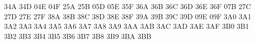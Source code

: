 { \mtsyadef@\blacktriangleleft34A
 \mtsyadef@\vartriangle34D
 \mtsyadef@\blacktriangle04E
 \mtsyadef@\triangledown04F
 \mtsyadef@{}
 \mtsyadef@{}
 \mtsyadef@{}
 \mtsyadef@{}
 \mtsyadef@{}
 \mtsyadef@{}
 \mtsyadef@{}
 \mtsyadef@{}
 \mtsyadef@\barwedge25A
 \mtsyadef@\doublebarwedge25B
 \mtsyadef@\measuredangle05D
 \mtsyadef@\sphericalangle05E
 \mtsyadef@\varpropto35F
 \mtsyadef@{}
 \mtsyadef@{}
 \mtsyadef@{}
 \mtsyadef@{}
 \mtsyadef@{}
 \let\doublecup\Cup
 \mtsyadef@{}
 \let\doublecap\Cap
 \mtsyadef@{}
 \mtsyadef@{}
 \mtsyadef@{}
 \mtsyadef@{}
 \mtsyadef@\subseteqq36A
 \mtsyadef@\supseteqq36B
 \mtsyadef@\bumpeq36C
 \mtsyadef@\Bumpeq36D
 \mtsyadef@\lll36E
 \let\llless\lll
 \mtsyadef@\ggg36F
 \let\gggtr\ggg
 \mtsyadef@{}
 \mtsyadef@{}
 \mtsyadef@{}
 \mtsyadef@{}
 \mtsyadef@{}
 \mtsyadef@\complement07B
 \mtsyadef@\intercal27C
 \mtsyadef@\circledcirc27D
 \mtsyadef@\circledast27E
 \mtsyadef@\circleddash27F
 \mtsyadef@{}
 \mtsyadef@{}
 \mtsyadef@{}
 \mtsyadef@{}
 \mtsyadef@{}
 \mtsyadef@{}
 \mtsyadef@{}
 \mtsyadef@{}
 \mtsyadef@{}
 \mtsyadef@{}
 \mtsyadef@\nleqslant38A
 \mtsyadef@\ngeqslant38B
 \mtsyadef@\lneq38C
 \mtsyadef@\gneq38D
 \mtsyadef@\npreceq38E
 \mtsyadef@\nsucceq38F
 \mtsyadef@{}
 \mtsyadef@{}
 \mtsyadef@{}
 \mtsyadef@{}
 \mtsyadef@{}
 \mtsyadef@{}
 \mtsyadef@{}
 \mtsyadef@{}
 \mtsyadef@{}
 \mtsyadef@{}
 \mtsyadef@\lnapprox39A
 \mtsyadef@\gnapprox39B
 \mtsyadef@\nsim39C
 \mtsyadef@\ncong39D
 \mtsyadef@\diagup09E
 \mtsyadef@\diagdown09F
 \mtsyadef@\varsubsetneq3A0
 \mtsyadef@\varsupsetneq3A1
 \mtsyadef@\nsubseteqq3A2
 \mtsyadef@\nsupseteqq3A3
 \mtsyadef@\subsetneqq3A4
 \mtsyadef@\supsetneqq3A5
 \mtsyadef@\varsubsetneqq3A6
 \mtsyadef@\varsupsetneqq3A7
 \mtsyadef@\subsetneq3A8
 \mtsyadef@\supsetneq3A9
 \mtsyadef@\nsubseteq3AA
 \mtsyadef@\nsupseteq3AB
 \mtsyadef@\nparallel3AC
 \mtsyadef@\nmid3AD
 \mtsyadef@\nshortmid3AE
 \mtsyadef@\nshortparallel3AF
 \mtsyadef@\nvdash3B0
 \mtsyadef@\nVdash3B1
 \mtsyadef@\nvDash3B2
 \mtsyadef@\nVDash3B3
 \mtsyadef@\ntrianglerighteq3B4
 \mtsyadef@\ntrianglelefteq3B5
 \mtsyadef@\ntriangleleft3B6
 \mtsyadef@\ntriangleright3B7
 \mtsyadef@\nleftarrow3B8
 \mtsyadef@\nrightarrow3B9
 \mtsyadef@\nLeftarrow3BA
 \mtsyadef@\nRightarrow3BB
}
